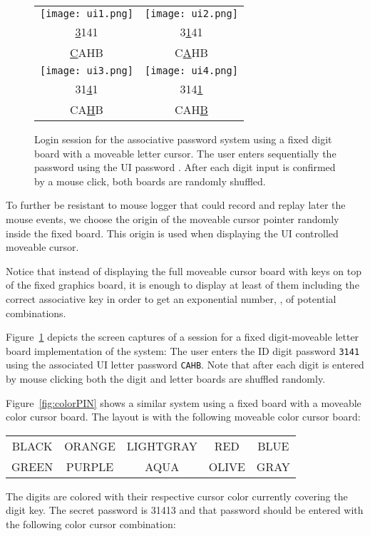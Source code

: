 \documentclass[12pt,onecolumn]{article}
\begin{document}
\begin{figure}
\centering

\begin{tabular}{cc}
\texttt{[image: ui1.png]} & \texttt{[image: ui2.png]} \\
\underline{3}141 & 3\underline{1}41 \\
\underline{C}AHB & C\underline{A}HB \\ 
\texttt{[image: ui3.png]} & \texttt{[image: ui4.png]} \\
31\underline{4}1 & 314\underline{1} \\
CA\underline{H}B & CAH\underline{B} \\ 
\end{tabular}
 
\caption{\label{fig:session}Login session for the associative password system using a  fixed digit board with a    moveable letter cursor. The user enters sequentially the password  using the UI password  . After each digit input is confirmed by a mouse click, both boards are randomly shuffled.}
\end{figure}

To further be resistant to mouse logger that could record and replay later the mouse events, we choose the origin of the moveable cursor pointer randomly inside the fixed board. This origin is used when displaying the UI controlled moveable cursor. 

Notice that instead of displaying the full moveable cursor board with  keys on top of the fixed graphics board, it is enough to display at least  of them including the correct associative key in order to get an exponential number, , of potential combinations. 

Figure~\ref{fig:session} depicts the screen captures of a session for a fixed digit-moveable  letter board implementation of the system:
 The user enters the ID digit password {\tt 3141} using the associated UI letter password {\tt CAHB}. 
 Note that after each digit is entered by mouse clicking both the digit and letter boards are shuffled randomly.
 
 

 

Figure~\ref{fig:colorPIN} shows a similar system using a fixed board with a moveable color cursor board. The layout is  with the following
 moveable color cursor board:\\
 \begin{center}
 \begin{tabular}{ccccc}
 BLACK & ORANGE & LIGHTGRAY& RED& BLUE\\
  GREEN& PURPLE & AQUA & OLIVE & GRAY
  \end{tabular}
  \end{center}
The digits are colored with their respective cursor color currently covering the digit key.
The secret password is 31413 and that password should be entered with the following color cursor combination:\\
\end{document}
